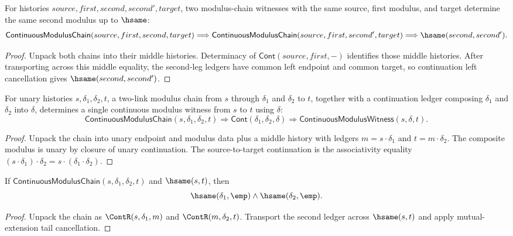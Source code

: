 \begin{theorem}
\label{thm:continuous-modulus-chain-second-deterministic}
For histories $source,first,second,second',target$, two modulus-chain witnesses
with the same source, first modulus, and target determine the same second
modulus up to $\hsame$:
$$
\mathsf{ContinuousModulusChain}(source,first,second,target)
\Longrightarrow
\mathsf{ContinuousModulusChain}(source,first,second',target)
\Longrightarrow
\hsame(second,second').
$$
\end{theorem}
\begin{proof}
Unpack both chains into their middle histories. Determinacy of
$\mathsf{Cont}(source,first,-)$ identifies those middle histories. After
transporting across this middle equality, the second-leg ledgers have common
left endpoint and common target, so continuation left cancellation gives
$\hsame(second,second')$.
\end{proof}

\begin{theorem}
\label{thm:continuous-modulus-chain-composite-closed}
For unary histories $s,\delta_1,\delta_2,t$, a two-link modulus chain from
$s$ through $\delta_1$ and $\delta_2$ to $t$, together with a continuation
ledger composing $\delta_1$ and $\delta_2$ into $\delta$, determines a single
continuous modulus witness from $s$ to $t$ using $\delta$:
$$
\mathsf{ContinuousModulusChain}(s,\delta_1,\delta_2,t)
\Longrightarrow
\mathsf{Cont}(\delta_1,\delta_2,\delta)
\Longrightarrow
\mathsf{ContinuousModulusWitness}(s,\delta,t).
$$
\end{theorem}
\begin{proof}
Unpack the chain into unary endpoint and modulus data plus a middle history
with ledgers $m=s\cdot\delta_1$ and $t=m\cdot\delta_2$. The composite modulus
is unary by closure of unary continuation. The source-to-target continuation is
the associativity equality $(s\cdot\delta_1)\cdot\delta_2
=s\cdot(\delta_1\cdot\delta_2)$.
\end{proof}

\begin{theorem}
\label{thm:continuous-modulus-chain-endpoint-cycle-moduli-empty}
If $\mathsf{ContinuousModulusChain}(s,\delta_1,\delta_2,t)$ and $\hsame(s,t)$, then
$$
\hsame(\delta_1,\emp)\land\hsame(\delta_2,\emp).
$$
\end{theorem}
\begin{proof}
Unpack the chain as $\ContR(s,\delta_1,m)$ and $\ContR(m,\delta_2,t)$. Transport the second ledger across $\hsame(s,t)$ and apply mutual-extension tail cancellation.
\end{proof}

